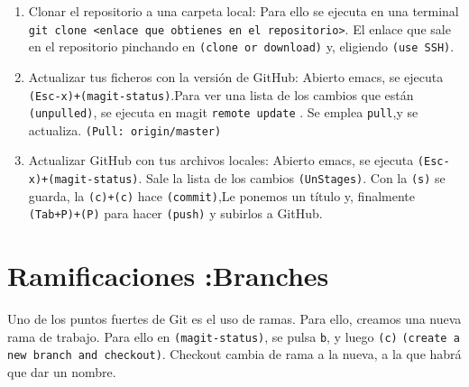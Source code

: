 \begin{enumerate}
\item Clonar el repositorio a una carpeta local:
  Para ello se ejecuta en una terminal
  \texttt{git clone <enlace que obtienes en el repositorio>}. El enlace
  que sale en el repositorio pinchando en \texttt{(clone or download)} y,
  eligiendo \texttt{(use SSH)}.

\item Actualizar tus ficheros con la versión de GitHub:
  Abierto emacs, se ejecuta \texttt{(Esc-x)+(magit-status)}.Para ver una
  lista de los cambios que están \texttt{(unpulled)}, se ejecuta en
  magit \texttt{remote update} . Se emplea \texttt{pull},y se actualiza.
  \texttt{(Pull: origin/master)}
\item Actualizar GitHub con tus archivos locales:
  Abierto emacs, se ejecuta \texttt{(Esc-x)+(magit-status)}. Sale la lista
  de los cambios \texttt{(UnStages)}. Con la \texttt{(s)} se guarda,
  la \texttt{(c)+(c)} hace \texttt{(commit)},Le ponemos un título y,
  finalmente \texttt{(Tab+P)+(P)} para hacer \texttt{(push)} y subirlos
  a GitHub.
\end{enumerate}

\section{Ramificaciones :Branches}

Uno de los puntos fuertes de Git es el uso de ramas. Para ello,
creamos una nueva rama de trabajo.
Para ello en \texttt{(magit-status)}, se pulsa \texttt{b}, y luego
\texttt{(c)} \texttt{(create a new branch and checkout)}. Checkout
cambia de rama a la nueva, a la que habrá que dar un nombre.